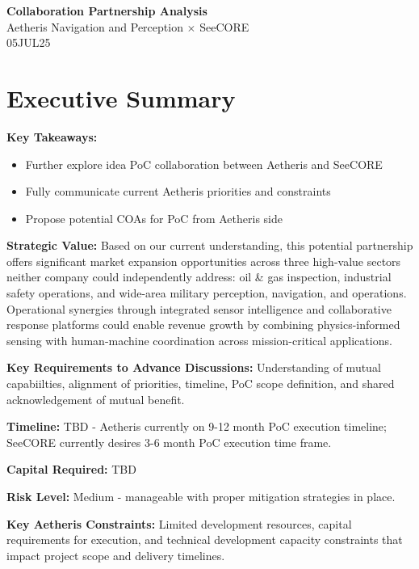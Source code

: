 \documentclass[11pt,letterpaper]{article}
\begin{document}
\begin{center}
    {\Huge\color{darkblue}\textbf{Collaboration Partnership Analysis}}\\
    \vspace{4pt}
    {\large\color{mediumgray}Aetheris Navigation and Perception $\times$} {\large\color{mediumgray}SeeCORE}\\
    \vspace{2pt}
    {\footnotesize\color{mediumgray}05JUL25}
\end{center}

\section*{Executive Summary}
\vspace{-8pt}
\sloppy
\begin{multicols}{2}
\textbf{\color{darkblue}Key Takeaways:}
\begin{itemize}[leftmargin=10pt, itemsep=1pt]
    \item Further explore idea PoC collaboration between Aetheris and SeeCORE
    \item Fully communicate current Aetheris priorities and constraints
    \item Propose potential COAs for PoC from Aetheris side
\end{itemize}

\textbf{Strategic Value:} Based on our current understanding, this potential partnership offers significant market expansion opportunities across three high-value sectors neither company could independently address: oil \& gas inspection, industrial safety operations, and wide-area military perception, navigation, and operations. Operational synergies through integrated sensor intelligence and collaborative response platforms could enable revenue growth by combining physics-informed sensing with human-machine coordination across mission-critical applications.

\columnbreak

\textbf{Key Requirements to Advance Discussions:} Understanding of mutual capabiilties, alignment of priorities, timeline, PoC scope definition, and shared acknowledgement of mutual benefit.

\textbf{Timeline:} TBD - Aetheris currently on 9-12 month PoC execution timeline; SeeCORE currently desires 3-6 month PoC execution time frame.

\textbf{Capital Required:} TBD

\textbf{Risk Level:} Medium - manageable with proper mitigation strategies in place.

\textbf{Key Aetheris Constraints:} Limited development resources, capital requirements for execution, and technical development capacity constraints that impact project scope and delivery timelines.
\end{multicols}
\end{document}
